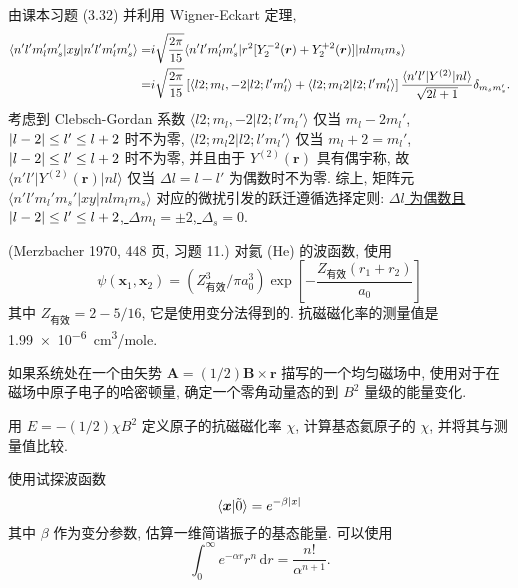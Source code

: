 \documentclass{assignment}
\begin{document}
\begin{sol}
\begin{itemize}
        由课本习题 (3.32) 并利用 Wigner-Eckart 定理,
        \begin{align}
            \notag\langle n'l'm_l'm_s'\rvert xy\lvert n'l'm_l'm_s'\rangle=&i\sqrt{\frac{2\pi}{15}}\langle n'l'm_l'm_s'\rvert r^2[Y_2^{-2}(\bm{r})+Y_2^{+2}(\bm{r})]\lvert nlm_lm_s\rangle\\
            =&i\sqrt{\frac{2\pi}{15}}\left[\langle l2;m_l,-2\vert l2;l'm_l'\rangle+\langle l2;m_l2\vert l2;l'm_l'\rangle\right]\frac{\langle n'l'\rvert Y^{(2)}\lvert nl\rangle}{\sqrt{2l+1}}\delta_{m_sm_s'}.
        \end{align}
        考虑到 Clebsch-Gordan 系数 $\langle l2;m_l,-2\vert l2;l'm_l'\rangle$ 仅当 $m_l-2m_l'$, $\left\lvert l-2\right\rvert\leq l'\leq l+2$ 时不为零, $\langle l2;m_l2\vert l2;l'm_l'\rangle$ 仅当 $m_l+2=m_l'$, $\left\lvert l-2\right\rvert\leq l'\leq l+2$ 时不为零, 并且由于 $Y^{(2)}(\bm{r})$ 具有偶宇称, 故 $\langle n'l'\rvert Y^{(2)}(\bm{r})\lvert nl\rangle$ 仅当 $\Delta l=l-l'$ 为偶数时不为零.
        综上, 矩阵元 $\langle n'l'm_l'm_s'\rvert xy\lvert nlm_lm_s\rangle$ 对应的微扰引发的跃迁遵循选择定则: \uline{$\Delta l$ 为偶数且 $\left\lvert l-2\right\rvert\leq l'\leq l+2$, $\Delta m_l=\pm 2$, $\Delta_s=0$}.
    \end{itemize}
\end{sol}

\begin{prob}[课本习题 5.19]
    (Merzbacher 1970, 448 页, 习题 11.) 对氦 (He) 的波函数, 使用
    \[
        \psi(\bm{x}_1,\bm{x}_2)=(Z_{\text{有效}}^3/\pi a_0^3)\exp\left[-\frac{Z_{\text{有效}}(r_1+r_2)}{a_0}\right]
    \]
    其中 $Z_{\text{有效}}=2-5/16$, 它是使用变分法得到的. 抗磁磁化率的测量值是 \SI{1.99e-6}{cm^3/mole}.

    如果系统处在一个由矢势 $\bm{A}=(1/2)\bm{B}\times\bm{r}$ 描写的一个均匀磁场中, 使用对于在磁场中原子电子的哈密顿量, 确定一个零角动量态的到 $B^2$ 量级的能量变化.

    用 $E=-(1/2)\chi B^2$ 定义原子的抗磁磁化率 $\chi$, 计算基态氦原子的 $\chi$, 并将其与测量值比较.
\end{prob}
\begin{sol}
    
\end{sol}

\begin{prob}[课本习题 5.20]
    使用试探波函数
    \[
        \langle\bm{x}\vert\tilde{0}\rangle=e^{-\beta\left\lvert x\right\rvert}
    \]
    其中 $\beta$ 作为变分参数, 估算一维简谐振子的基态能量. 可以使用
    \[
        \int_0^{\infty}e^{-\alpha r}r^n\,\mathrm{d}r=\frac{n!}{\alpha^{n+1}}.
    \]
\end{prob}
\begin{sol}
    
\end{sol}
\end{document}
